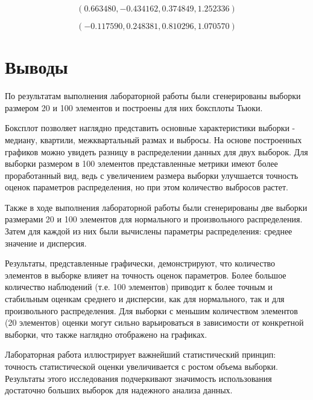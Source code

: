 \documentclass[12pt,a4paper]{article}
\begin{document}
	\vspace{12em}

	\[
		(0.663480, -0.434162, 0.374849, 1.252336)
	\]

	\[
		(-0.117590, 0.248381, 0.810296, 1.070570)
	\]

	\vspace{10em}

	\section{Выводы}

	По результатам выполнения лабораторной работы были сгенерированы выборки размером 20 и 100 элементов и построены для них боксплоты Тьюки.

	Боксплот позволяет наглядно представить основные характеристики выборки - медиану, квартили, межквартальный размах и выбросы. На основе построенных графиков можно увидеть разницу в распределении данных для двух выборок. Для выборки размером в 100 элементов представленные метрики имеют более проработанный вид, ведь с увеличением размера выборки улучшается точность оценок параметров распределения, но при этом количество выбросов растет.

	Также в ходе выполнения лабораторной работы были сгенерированы две выборки размерами 20 и 100 элементов для нормального и произвольного распределения. Затем для каждой из них были вычислены параметры распределения: среднее значение и дисперсия.

	Результаты, представленные графически, демонстрируют, что количество элементов в выборке влияет на точность оценок параметров. Более большое количество наблюдений (т.е. 100 элементов) приводит к более точным и стабильным оценкам среднего и дисперсии, как для нормального, так и для произвольного распределения. Для выборки с меньшим количеством элементов (20 элементов) оценки могут сильно варьироваться в зависимости от конкретной выборки, что также наглядно отображено на графиках.

	Лабораторная работа иллюстрирует важнейший статистический принцип: точность статистической оценки увеличивается с ростом объема выборки. Результаты этого исследования подчеркивают значимость использования достаточно больших выборок для надежного анализа данных.
\end{document}
